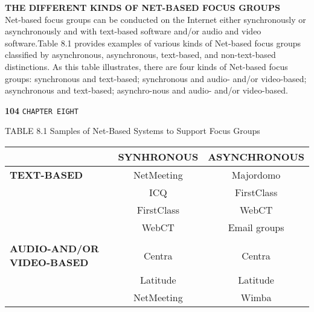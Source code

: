 \documentclass{book}
\begin{document}
\vspace*{1cm}
\textbf{THE DIFFERENT KINDS OF NET-BASED FOCUS GROUPS}\\

\vspace*{0.3cm}
Net-based focus groups can be conducted on the Internet either synchronously or asynchronously and with text-based software and/or audio and video software.Table 8.1 provides examples of various kinds of Net-based focus groups classified by asynchronous, asynchronous, text-based, and non-text-based distinctions. As this table illustrates, there are four kinds of Net-based focus groups: synchronous and text-based; synchronous and audio- and/or video-based; asynchronous and text-based; asynchro-nous and audio- and/or video-based.\\

\newpage

\begin{flushleft}
\textbf{104}\hspace*{1cm} \texttt{CHAPTER EIGHT}
\end{flushleft}

\vspace*{1cm}
\begin{flushleft}
TABLE 8.1 \hspace*{0.2cm} Samples of Net-Based Systems to Support Focus Groups \\
\begin{tabular}{lcc}

 \hline

 \hline

 \hline

 \hline

                                    &  \textbf{SYNHRONOUS}    & \textbf{ASYNCHRONOUS}\\
\hline
\textbf{TEXT-BASED}                 &    NetMeeting  &  Majordomo \\
                                    &     ICQ        &   FirstClass \\
                                    &    FirstClass  &  WebCT   \\
                                    &     WebCT      &  Email groups    \\
                                    &                &                  \\
\textbf{AUDIO-AND/OR VIDEO-BASED}   &    Centra      &   Centra          \\
                                    &     Latitude   &   Latitude         \\
                                    &     NetMeeting &   Wimba         \\

 \hline

 \hline

 \hline

 \hline
\end{tabular}
\end{flushleft}
\end{document}
